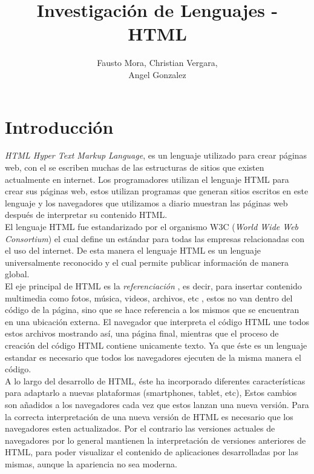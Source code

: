 \documentclass[11pt]{article} %
\title{Investigación de Lenguajes - HTML}
\author{Fausto Mora, Christian Vergara, \\ Angel Gonzalez}
\begin{document}

\maketitle

\section{Introducción}
\newcommand{\oops}[1]{\textit{#1}}

\noindent \emph{HTML \oops{{\color{black}Hyper Text Markup Language}}}, es un lenguaje utilizado para crear páginas web, con el se escriben muchas de las estructuras de sitios que existen actualmente en internet.
Los programadores utilizan el lenguaje HTML para crear sus páginas web, estos utilizan programas que generan sitios escritos en este lenguaje y los navegadores que utilizamos a diario muestran las páginas web después de interpretar su contenido HTML.\\

\noindent El lenguaje HTML fue estandarizado por el organismo W3C (\oops{World Wide Web Consortium}) el cual define un estándar para todas las empresas relacionadas con el uso del internet. De esta manera el lenguaje HTML es un lenguaje universalmente reconocido y el cual permite publicar información de manera global.\\

\noindent El eje principal de HTML es la \oops{referenciación} , es decir, para insertar contenido multimedia como fotos, música, videos, archivos, etc , estos no van dentro del código de la página, sino que se hace referencia a los mismos que se encuentran en una ubicación externa. El navegador que interpreta el código HTML une todos estos archivos mostrando así, una página final, mientras que el proceso de creación del código HTML contiene unicamente texto. Ya que éste es un lenguaje estandar es necesario que todos los navegadores ejecuten de la misma manera el código.\\

\noindent A lo largo del desarrollo de HTML, éste ha incorporado diferentes características para adaptarlo a nuevas plataformas (smartphones, tablet, etc), Estos cambios son añadidos a los navegadores cada vez que estos lanzan una nueva versión. Para la correcta interpretación de una nueva versión de HTML es necesario que los navegadores esten actualizados. Por el contrario las versiones actuales de navegadores por lo general mantienen la interpretación de versiones anteriores de HTML, para poder visualizar el contenido de aplicaciones desarrolladas por las mismas, aunque la apariencia no sea moderna.\\
\end{document}
